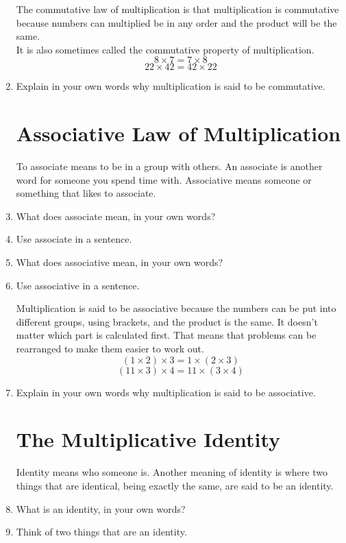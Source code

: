 \documentclass[12pt]{article}
\begin{document}
\begin{enumerate}
The commutative law of multiplication is that multiplication is commutative because numbers can multiplied be in any order and the product will be the same.\\

It is also sometimes called the commutative property of multiplication.\\

$$8 \times 7 = 7\times 8$$
$$22 \times 42 = 42 \times 22$$

\item Explain in your own words why multiplication is said to be commutative.

\section*{Associative Law of Multiplication}
To associate means to be in a group with others. An associate is another word for someone you spend time with. Associative means someone or something that likes to associate.\\

\item What does associate mean, in your own words?
\item Use associate in a sentence.
\item What does associative mean, in your own words?
\item Use associative in a sentence.

Multiplication is said to be associative because the numbers can be put into different groups, using brackets, and the product is the same. It doesn't matter which part is calculated first. That means that problems can be rearranged to make them easier to work out.\\

$$(1\times2)\times3=1\times(2\times3)$$
$$(11\times3)\times4=11\times(3\times4)$$

\item Explain in your own words why multiplication is said to be associative.

\section*{The Multiplicative Identity}
Identity means who someone is. Another meaning of identity is where two things that are identical, being exactly the same, are said to be an identity.\\

\item What is an identity, in your own words?
\item Think of two things that are an identity.


\end{enumerate}
\end{document}
